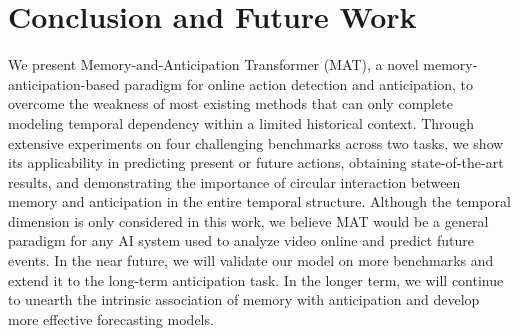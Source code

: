 \vspace{-0.5em}
\section{Conclusion and Future Work}
\label{sec:conclusion}
We present Memory-and-Anticipation Transformer (MAT), a novel memory-anticipation-based paradigm for online action detection and anticipation, to overcome the weakness of most existing methods that can only complete modeling temporal dependency within a limited historical context. 
Through extensive experiments on four challenging benchmarks across two tasks, we show its applicability in predicting present or future actions, obtaining state-of-the-art results, and demonstrating the importance of circular interaction between memory and anticipation in the entire temporal structure. Although the temporal dimension is only considered in this work, 
we believe MAT would be a general paradigm for any AI system used to analyze video online and predict future events.
In the near future, we will validate our model on more benchmarks and extend it to the long-term anticipation task. In the longer term, we will continue to unearth the intrinsic association of memory with anticipation and develop more effective forecasting models.